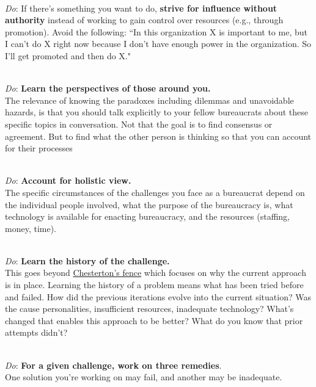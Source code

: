 \ \\
\textit{Do}: If there's something you want to do, \textbf{strive for influence without authority} instead of working to gain control over resources (e.g., through promotion). Avoid the following: ``In this organization X is important to me, but I can't do X right now because I don't have enough power in the organization. So I'll get promoted and then do X."

\ \\
\textit{Do}: \textbf{Learn the perspectives of those around you.}\\
The relevance of knowing the paradoxes including dilemmas and unavoidable hazards, is that you should talk explicitly to your fellow bureaucrats about these specific topics in conversation. Not that the goal is to find consensus or agreement. But to find what the other person is thinking so that you can account for their processes

\ \\
\textit{Do}: \textbf{Account for holistic view.}\\
The specific circumstances of the challenges you face as a bureaucrat depend on the individual people involved, what the purpose of the bureaucracy is, what technology is available for enacting bureaucracy, and the resources (staffing, money, time). 

\ \\
\textit{Do}: \textbf{Learn the history of the challenge.}\\
This goes beyond \href{https://en.wikipedia.org/wiki/G._K._Chesterton\%23Chesterton's_fence}{Chesterton's fence}
\iftoggle{WPinmargin}{\marginpar{$>$Wikipedia: Chesterton's fence}}{}
\iftoggle{haspagenumbers}{(see page~\pageref{concept:chestertons_fence}), }{,}
which focuses on why the current approach is in place. Learning the history of a problem means what has been tried before and failed. How did the previous iterations evolve into the current situation? Was the cause personalities, insufficient resources, inadequate technology? What's changed that enables this approach to be better? What do you know that prior attempts didn't?

\ \\
\textit{Do}: \textbf{For a given challenge, work on three remedies}.\\
One solution you're working on may fail, and another may be inadequate. 

